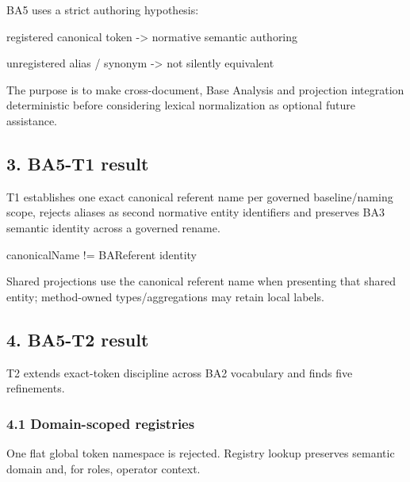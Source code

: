 \documentclass[
  10pt,
  a4paper,
]{article}
\newenvironment{Shaded}{}{}
\newcommand{\NormalTok}[1]{#1}
\begin{document}
BA5 uses a strict authoring hypothesis:

\begin{Shaded}
\begin{Highlighting}[]
\NormalTok{registered canonical token}
\NormalTok{    {-}\textgreater{} normative semantic authoring}

\NormalTok{unregistered alias / synonym}
\NormalTok{    {-}\textgreater{} not silently equivalent}
\end{Highlighting}
\end{Shaded}

The purpose is to make cross-document, Base Analysis and projection
integration deterministic before considering lexical normalization as
optional future assistance.

\subsection{3. BA5-T1 result}\label{ba5-t1-result}

T1 establishes one exact canonical referent name per governed
baseline/naming scope, rejects aliases as second normative entity
identifiers and preserves BA3 semantic identity across a governed
rename.

\begin{Shaded}
\begin{Highlighting}[]
\NormalTok{canonicalName != BAReferent identity}
\end{Highlighting}
\end{Shaded}

Shared projections use the canonical referent name when presenting that
shared entity; method-owned types/aggregations may retain local labels.

\subsection{4. BA5-T2 result}\label{ba5-t2-result}

T2 extends exact-token discipline across BA2 vocabulary and finds five
refinements.

\subsubsection{4.1 Domain-scoped
registries}\label{domain-scoped-registries}

One flat global token namespace is rejected. Registry lookup preserves
semantic domain and, for roles, operator context.
\end{document}
